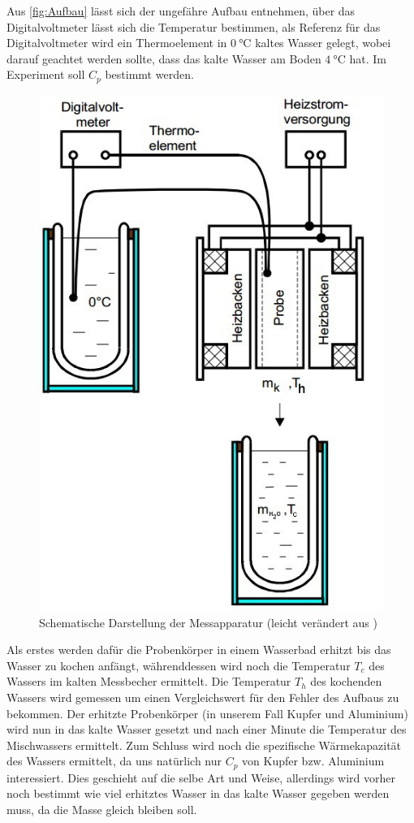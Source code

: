 Aus \autoref{fig:Aufbau} lässt sich der ungefähre Aufbau entnehmen, über das Digitalvoltmeter lässt sich die Temperatur bestimmen, als Referenz für das Digitalvoltmeter wird ein Thermoelement in $\SI{0}{\celsius}$ kaltes Wasser gelegt, wobei darauf geachtet werden sollte, dass das kalte Wasser am Boden $\SI{4}{\celsius}$ hat.
Im Experiment soll $C_p$ bestimmt werden.\\

\begin{figure}
	\includegraphics[scale=0.5]{Grafiken/Aufbau.jpg}
	\caption{Schematische Darstellung der Messapparatur (leicht verändert aus \cite{V201})}
	\label{fig:Aufbau}
\end{figure}
Als erstes werden dafür die Probenkörper in einem Wasserbad erhitzt bis
das Wasser zu kochen anfängt, währenddessen wird noch die Temperatur $T_c$ des Wassers im kalten Messbecher ermittelt. Die Temperatur $T_h$ des kochenden Wassers wird gemessen um einen Vergleichswert für den Fehler des Aufbaus zu bekommen.
Der erhitzte Probenkörper (in unserem Fall Kupfer und Aluminium) wird nun in das kalte Wasser gesetzt und nach einer Minute die Temperatur des Mischwassers ermittelt.
Zum Schluss wird noch die spezifische Wärmekapazität des Wassers ermittelt, da uns natürlich nur $C_p$ von Kupfer bzw. Aluminium interessiert. Dies geschieht auf die selbe Art und Weise, allerdings wird 
vorher noch bestimmt wie viel erhitztes Wasser in das kalte Wasser gegeben werden muss, da die Masse gleich bleiben soll.
